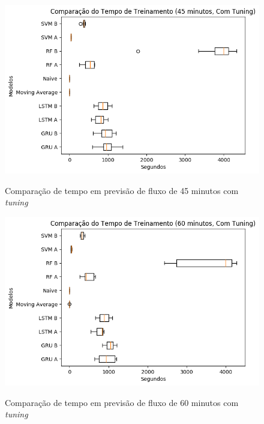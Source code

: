 \begin{figure}[htbp]
    \centering
    \includegraphics[scale=0.8]{monography/img/snapshots/comparacao_do_tempo_de_treinamento_(45_minutos,_com_tuning)_performance_boxes.png}
    \label{figure:comparacao_previsao_tempo_45_com_tuning}
    \caption{Comparação de tempo em previsão de fluxo de 45 minutos com \textit{tuning}}
\end{figure}

\begin{figure}[htbp]
    \centering
    \includegraphics[scale=0.8]{monography/img/snapshots/comparacao_do_tempo_de_treinamento_(60_minutos,_com_tuning)_performance_boxes.png}
    \label{figure:comparacao_previsao_tempo_60_com_tuning}
    \caption{Comparação de tempo em previsão de fluxo de 60 minutos com \textit{tuning}}
\end{figure}